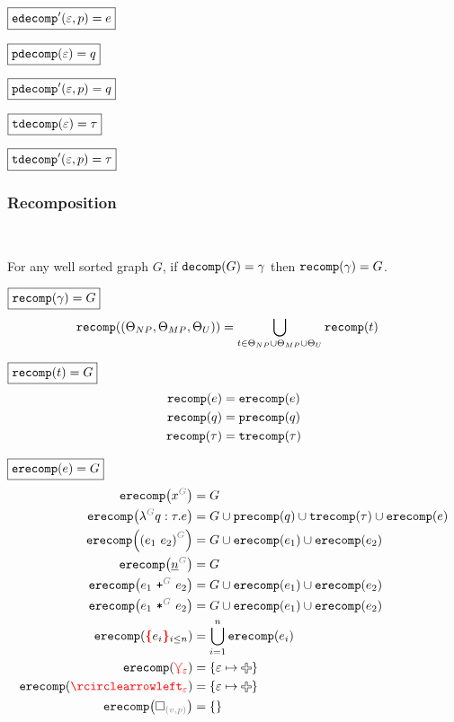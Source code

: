 \noindent $\boxed{\edecompPrime{\e}{p} = e}$
%
\figureDecompositionDefEdecompPrime

\noindent $\boxed{\pdecomp{\e} = q}$
%
\figureDecompositionDefPdecomp

\noindent $\boxed{\pdecompPrime{\e}{p} = q}$
%
\figureDecompositionDefPdecompPrime

\noindent $\boxed{\tdecomp{\e} = \tau}$
%
\figureDecompositionDefTdecomp

\noindent $\boxed{\tdecompPrime{\e}{p} = \tau}$
%
\figureDecompositionDefTdecompPrime%


\subsubsection{Recomposition}\hspace*{\fill} \\

\begin{theorem}
  For any well sorted graph $G$,
  if $\decomp{G} = \Grove$ then $\recomp{\Grove} = G$.
\end{theorem}

\noindent $\boxed{\recomp{\Grove} = G}$
%
\begin{align*}
  \recomp{(\Set[NP], \Set[MP], \Set[U])} &= \bigcup_{t \in \Set[NP] \cup \Set[MP] \cup \Set[U]} \recomp{t}
\end{align*}

\noindent $\boxed{\recomp{t} = G}$
%
\begin{align*}
  \recomp{e} &= \erecomp{e} \\
  \recomp{q} &= \precomp{q} \\
  \recomp{\tau} &= \trecomp{\tau}
\end{align*}

\noindent $\boxed{\erecomp{e} = G}$
%
\begin{align*}
  \erecomp{\eVar{G}{x}} &= G
  \\
  \erecomp{\eFun{G}{q}{\tau}{e}}
    &= G \cup \precomp{q} \cup \trecomp{\tau} \cup \erecomp{e}
  \\
  \erecomp{\eApp{G}{e_1}{e_2}}
    &= G \cup \erecomp{e_1} \cup \erecomp{e_2}
  \\
  \erecomp{\eNum{G}{n}} &= G
  \\
  \erecomp{\ePlus{G}{e_1}{e_2}}
    &= G \cup \erecomp{e_1} \cup \erecomp{e_2}
  \\
  \erecomp{\eTimes{G}{e_1}{e_2}}
    &= G \cup \erecomp{e_1} \cup \erecomp{e_2}
  \\
  \erecomp{\conflictHole[i \leq n]{e_i}}
  &= \bigcup_{i=1}^n \erecomp{e_i}
  \\
  \erecomp{\multiVertex{\e}} &= \SetOf{\e \mapsto \Plus}
  \\
  \erecomp{\cycleVertex{\e}} &= \SetOf{\e \mapsto \Plus}
  \\
  \erecomp{\emptyHole{v}{p}} &= \SetOf{}
\end{align*}


